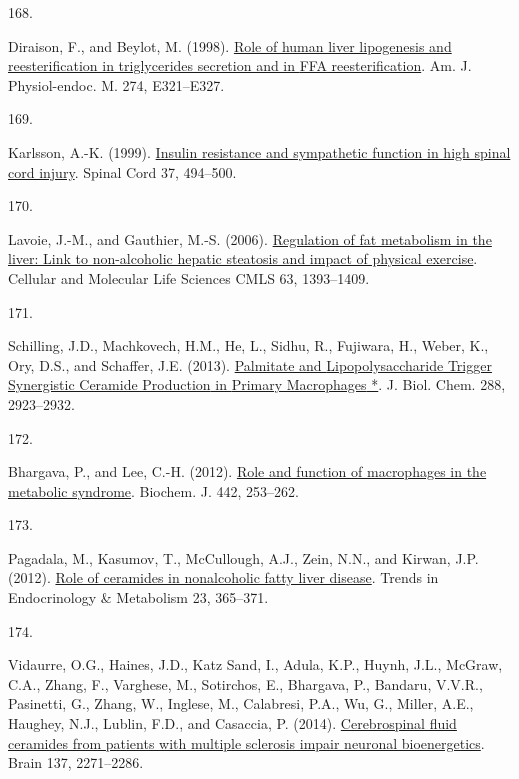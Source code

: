 \documentclass[
]{article}
\newlength{\cslhangindent}
\newlength{\csllabelwidth}
\newlength{\cslentryspacingunit} %
\newenvironment{CSLReferences}[2] %
 {%
  \setlength{\parindent}{0pt}
  \ifodd #1
  \let\oldpar\par
  \def\par{\hangindent=\cslhangindent\oldpar}
  \fi
  \setlength{\parskip}{#2\cslentryspacingunit}
 }%
 {}
\newcommand{\CSLLeftMargin}[1]{\parbox[t]{\csllabelwidth}{#1}}
\newcommand{\CSLRightInline}[1]{\parbox[t]{\linewidth - \csllabelwidth}{#1}\break}
\begin{document}
\begin{CSLReferences}{0}{0}
\leavevmode{}%
\CSLLeftMargin{168. }
\CSLRightInline{Diraison, F., and Beylot, M. (1998). \href{https://doi.org/10.1152/ajpendo.1998.274.2.E321}{Role of human liver lipogenesis and reesterification in triglycerides secretion and in {FFA} reesterification}. Am. J. Physiol-endoc. M. 274, E321--E327.}

\leavevmode{}%
\CSLLeftMargin{169. }
\CSLRightInline{Karlsson, A.-K. (1999). \href{https://doi.org/10.1038/sj.sc.3100844}{Insulin resistance and sympathetic function in high spinal cord injury}. Spinal Cord 37, 494--500.}

\leavevmode{}%
\CSLLeftMargin{170. }
\CSLRightInline{Lavoie, J.-M., and Gauthier, M.-S. (2006). \href{https://doi.org/10.1007/s00018-006-6600-y}{Regulation of fat metabolism in the liver: Link to non-alcoholic hepatic steatosis and impact of physical exercise}. Cellular and Molecular Life Sciences CMLS 63, 1393--1409.}

\leavevmode{}%
\CSLLeftMargin{171. }
\CSLRightInline{Schilling, J.D., Machkovech, H.M., He, L., Sidhu, R., Fujiwara, H., Weber, K., Ory, D.S., and Schaffer, J.E. (2013). \href{https://doi.org/10.1074/jbc.M112.419978}{Palmitate and {Lipopolysaccharide Trigger Synergistic Ceramide Production} in {Primary Macrophages} *}. J. Biol. Chem. 288, 2923--2932.}

\leavevmode{}%
\CSLLeftMargin{172. }
\CSLRightInline{Bhargava, P., and Lee, C.-H. (2012). \href{https://doi.org/10.1042/BJ20111708}{Role and function of macrophages in the metabolic syndrome}. Biochem. J. 442, 253--262.}

\leavevmode{}%
\CSLLeftMargin{173. }
\CSLRightInline{Pagadala, M., Kasumov, T., McCullough, A.J., Zein, N.N., and Kirwan, J.P. (2012). \href{https://doi.org/10.1016/j.tem.2012.04.005}{Role of ceramides in nonalcoholic fatty liver disease}. Trends in Endocrinology \& Metabolism 23, 365--371.}

\leavevmode{}%
\CSLLeftMargin{174. }
\CSLRightInline{Vidaurre, O.G., Haines, J.D., Katz Sand, I., Adula, K.P., Huynh, J.L., McGraw, C.A., Zhang, F., Varghese, M., Sotirchos, E., Bhargava, P., Bandaru, V.V.R., Pasinetti, G., Zhang, W., Inglese, M., Calabresi, P.A., Wu, G., Miller, A.E., Haughey, N.J., Lublin, F.D., and Casaccia, P. (2014). \href{https://doi.org/10.1093/brain/awu139}{Cerebrospinal fluid ceramides from patients with multiple sclerosis impair neuronal bioenergetics}. Brain 137, 2271--2286.}


\end{CSLReferences}
\end{document}
